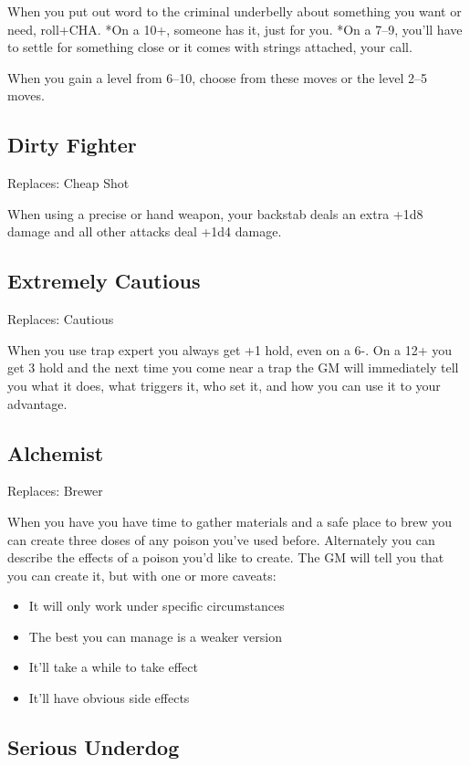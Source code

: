  When you put out word to the criminal underbelly about something you want or need, roll+CHA. *On a 10+, someone has it, just for you. *On a 7--9, you'll have to settle for something close or it comes with strings attached, your call.


\vspace{\baselineskip}
 {\Large When you gain a level from 6--10, choose from these moves or the level 2--5 moves.}
\subsection{Dirty Fighter}


 Replaces: Cheap Shot


 When using a precise or hand weapon, your backstab deals an extra +1d8 damage and all other attacks deal +1d4 damage.
\subsection{Extremely Cautious}


 Replaces: Cautious


 When you use trap expert you always get +1 hold, even on a 6-. On a 12+ you get 3 hold and the next time you come near a trap the GM will immediately tell you what it does, what triggers it, who set it, and how you can use it to your advantage.
\subsection{Alchemist}


 Replaces: Brewer


 When you have you have time to gather materials and a safe place to brew you can create three doses of any poison you've used before. Alternately you can describe the effects of a poison you'd like to create. The GM will tell you that you can create it, but with one or more caveats:
\begin{itemize}
\item It will only work under specific circumstances
\item The best you can manage is a weaker version
\item It'll take a while to take effect
\item It'll have obvious side effects

\end{itemize}
\subsection{Serious Underdog}


